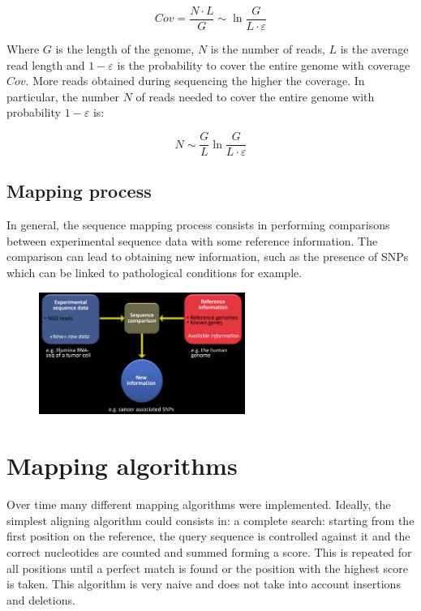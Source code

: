     $$Cov = \frac{N\cdot L}{G}\sim\ln \frac{G}{L\cdot\varepsilon}$$

    Where $G$ is the length of the genome, $N$ is the  number of reads, $L$ is the average read length and $1-\varepsilon$ is the probability to cover the entire genome with coverage $Cov$.
    More reads obtained during sequencing the higher the coverage.
    In particular, the number $N$ of reads needed to cover the entire genome with probability $1-\varepsilon$ is:

    $$N\sim\frac{G}{L}\ln\frac{G}{L\cdot\varepsilon}$$

    \subsection{Mapping process}
    In general, the sequence mapping process consists in performing comparisons between experimental sequence data with some reference information.
    The comparison can lead to obtaining new information, such as the presence of SNPs which can be linked to pathological conditions for example.

    \begin{figure}[h]
    \centering
    \includegraphics[width=0.6\textwidth]{SequenceComparison.png}
    \caption{}
    \end{figure}

\section{Mapping algorithms}
Over time many different mapping algorithms were implemented.
Ideally, the simplest aligning algorithm could consists in: a complete search: starting from the first position on the reference, the query sequence is controlled against it and the correct nucleotides are counted and summed forming a score.
This is repeated for all positions until a perfect match is found or the position with the highest score is taken.
This algorithm is very naive and does not take into account insertions and deletions.

